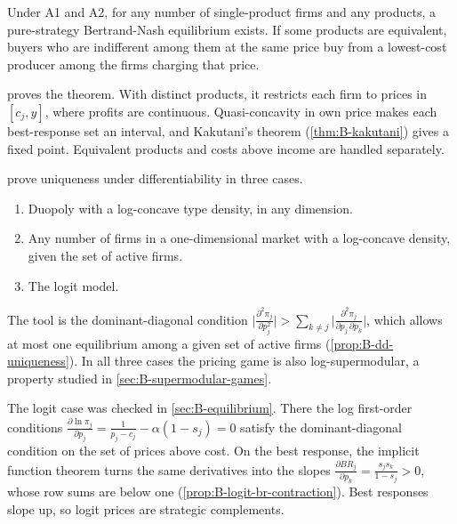 \begin{theorem}\label{thm:B-cn-existence}
Under A1 and A2, for any number of single-product firms and any products, a pure-strategy Bertrand-Nash equilibrium
exists. If some products are equivalent, buyers who are indifferent among them at the same price buy from a lowest-cost
producer among the firms charging that price.
\end{theorem}

 proves the theorem. With distinct products, it restricts each firm to prices in
$[c_j, y]$, where profits are continuous. Quasi-concavity in own price makes each best-response set an interval,
and Kakutani's theorem (\cref{thm:B-kakutani}) gives a fixed point. Equivalent products and costs above income
are handled separately.

\citet[Section 6]{CaplinNalebuff1991} prove uniqueness under differentiability in three cases.
\begin{enumerate}[label=(\alph*)]
  \item Duopoly with a log-concave type density, in any dimension.
  \item Any number of firms in a one-dimensional market with a log-concave density, given the set of active firms.
  \item The logit model.
\end{enumerate}
The tool is the dominant-diagonal condition
$\bigl|\frac{\partial^2\pi_j}{\partial p_j^2}\bigr| > \sum_{k \neq j}\bigl|\frac{\partial^2\pi_j}{\partial p_j\,\partial p_k}\bigr|$, which
allows at most one equilibrium among a given set of active firms \citep{Friedman1977}
(\cref{prop:B-dd-uniqueness}). In all three cases the pricing game is also log-supermodular, a property
studied in \cref{sec:B-supermodular-games}.

The logit case was checked in \cref{sec:B-equilibrium}. There the log first-order conditions
$\frac{\partial\ln\pi_j}{\partial p_j} = \frac{1}{p_j - c_j} - \alpha(1 - s_j) = 0$ satisfy the dominant-diagonal condition on
the set of prices above cost. On the best response, the implicit function theorem turns the same derivatives into
the slopes $\frac{\partial BR_j}{\partial p_k} = \frac{s_js_k}{1 - s_j} > 0$, whose row sums are below one
(\cref{prop:B-logit-br-contraction}). Best responses slope up, so logit prices are strategic complements.


